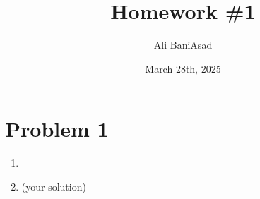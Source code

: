 \documentclass[12]{fphw}
\title{Homework \#1} %
\author{Ali BaniAsad} %
\date{March 28th, 2025} %
\institute{Sharif University of Technology \\ Institute of Aerospace} %
\begin{document}
\maketitle %
\section*{Problem 1}

\begin{enumerate}[label=(\alph*)]
	\item 
	
	\item (your solution)
\end{enumerate}
\end{document}
